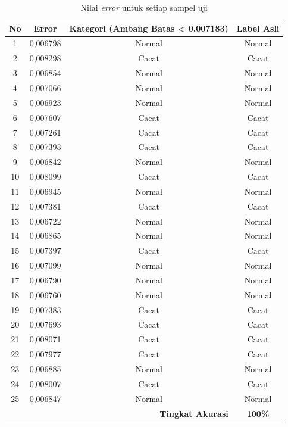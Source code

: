 \begin{table}[H]
  \centering
  \caption{Nilai \textit{error} untuk setiap sampel uji}
  \label{tab:error-samples-web}
  \begin{tabular}{cccc}
    \toprule
    \textbf{No} & \textbf{Error} & \textbf{Kategori
      (Ambang Batas <
    0,007183)} & \textbf{Label Asli} \\
    \midrule
    1  & 0,006798 & Normal & Normal \\
    2  & 0,008298 & Cacat & Cacat \\
    3  & 0,006854 & Normal & Normal \\
    4  & 0,007066 & Normal & Normal \\
    5  & 0,006923 & Normal & Normal \\
    6  & 0,007607 & Cacat & Cacat \\
    7  & 0,007261 & Cacat & Cacat \\
    8  & 0,007393 & Cacat & Cacat \\
    9  & 0,006842 & Normal & Normal \\
    10 & 0,008099 & Cacat & Cacat \\
    11 & 0,006945 & Normal & Normal \\
    12 & 0,007381 & Cacat & Cacat \\
    13 & 0,006722 & Normal & Normal \\
    14 & 0,006865 & Normal & Normal \\
    15 & 0,007397 & Cacat & Cacat \\
    16 & 0,007099 & Normal & Normal \\
    17 & 0,006790 & Normal & Normal \\
    18 & 0,006760 & Normal & Normal \\
    19 & 0,007383 & Cacat & Cacat \\
    20 & 0,007693 & Cacat & Cacat \\
    21 & 0,008071 & Cacat & Cacat \\
    22 & 0,007977 & Cacat & Cacat \\
    23 & 0,006885 & Normal & Normal \\
    24 & 0,008007 & Cacat & Cacat \\
    25 & 0,006847 & Normal & Normal \\
    \midrule
    \multicolumn{3}{r}{\textbf{Tingkat Akurasi}} & \textbf{100\%} \\
    \bottomrule
  \end{tabular}
\end{table}

